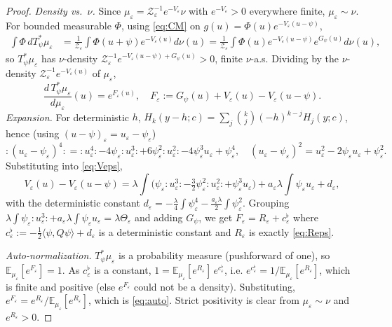 \documentclass[12pt]{article}
\newcommand{\bE}{\mathbb{E}}
\newcommand{\Wick}[1]{{:}#1{:}}
\newcommand{\eps}{\varepsilon}
\theoremstyle{plain}
\theoremstyle{definition}
\begin{document}
\begin{proof}
\emph{Density vs.\ $\nu$.} Since $\mu_\eps=\mathcal Z_\eps^{-1}e^{-V_\eps}\nu$ with
$e^{-V_\eps}>0$ everywhere finite, $\mu_\eps\sim\nu$. For bounded measurable $\Phi$,
using \eqref{eq:CM} on $g(u)=\Phi(u)e^{-V_\eps(u-\psi)}$,
\begin{align*}
\int\Phi\,dT_\psi^\ast\mu_\eps
&=\tfrac1{\mathcal Z_\eps}\!\int\Phi(u+\psi)e^{-V_\eps(u)}d\nu(u)
=\tfrac1{\mathcal Z_\eps}\!\int\Phi(u)e^{-V_\eps(u-\psi)}e^{G_\psi(u)}d\nu(u),
\end{align*}
so $T_\psi^\ast\mu_\eps$ has $\nu$-density $\mathcal Z_\eps^{-1}e^{-V_\eps(u-\psi)+G_\psi(u)}>0$,
finite $\nu$-a.s. Dividing by the $\nu$-density $\mathcal Z_\eps^{-1}e^{-V_\eps(u)}$ of
$\mu_\eps$,
\begin{equation}\label{eq:Feps}
\frac{d\,T_\psi^\ast\mu_\eps}{d\mu_\eps}(u)=e^{F_\eps(u)},\quad
F_\eps:=G_\psi(u)+V_\eps(u)-V_\eps(u-\psi).
\end{equation}
\emph{Expansion.} For deterministic $h$, $H_k(y-h;c)=\sum_j\binom kj(-h)^{k-j}H_j(y;c)$,
hence (using $(u-\psi)_\eps=u_\eps-\psi_\eps$)
\[
\Wick{(u_\eps-\psi_\eps)^4}=\Wick{u_\eps^4}-4\psi_\eps\Wick{u_\eps^3}+6\psi_\eps^2\Wick{u_\eps^2}-4\psi_\eps^3u_\eps+\psi_\eps^4,
\quad (u_\eps-\psi_\eps)^2=u_\eps^2-2\psi_\eps u_\eps+\psi_\eps^2.
\]
Substituting into \eqref{eq:Veps},
\begin{equation}\label{eq:VmV}
V_\eps(u)-V_\eps(u-\psi)
=\lambda\!\int\!\Big(\psi_\eps\Wick{u_\eps^3}-\tfrac32\psi_\eps^2\Wick{u_\eps^2}+\psi_\eps^3u_\eps\Big)
+a_\eps\lambda\!\int\psi_\eps u_\eps+d_\eps,
\end{equation}
with the deterministic constant $d_\eps=-\tfrac\lambda4\int\psi_\eps^4-\tfrac{a_\eps\lambda}2\int\psi_\eps^2$.
Grouping $\lambda\int\psi_\eps\Wick{u_\eps^3}+a_\eps\lambda\int\psi_\eps u_\eps=\lambda\Theta_\eps$ and
adding $G_\psi$, we get $F_\eps=R_\eps+c_\eps^\flat$ where
$c_\eps^\flat:=-\tfrac12\langle\psi,Q\psi\rangle+d_\eps$ is a deterministic constant and
$R_\eps$ is exactly \eqref{eq:Reps}.

\emph{Auto-normalization.} $T_\psi^\ast\mu_\eps$ is a probability measure (pushforward
of one), so $\bE_{\mu_\eps}[e^{F_\eps}]=1$. As $c_\eps^\flat$ is a constant,
$1=\bE_{\mu_\eps}[e^{R_\eps}]\,e^{c_\eps^\flat}$, i.e. $e^{c_\eps^\flat}=1/\bE_{\mu_\eps}[e^{R_\eps}]$,
which is finite and positive (else $e^{F_\eps}$ could not be a density). Substituting,
$e^{F_\eps}=e^{R_\eps}/\bE_{\mu_\eps}[e^{R_\eps}]$, which is \eqref{eq:auto}. Strict
positivity is clear from $\mu_\eps\sim\nu$ and $e^{R_\eps}>0$.
\end{proof}
\end{document}
